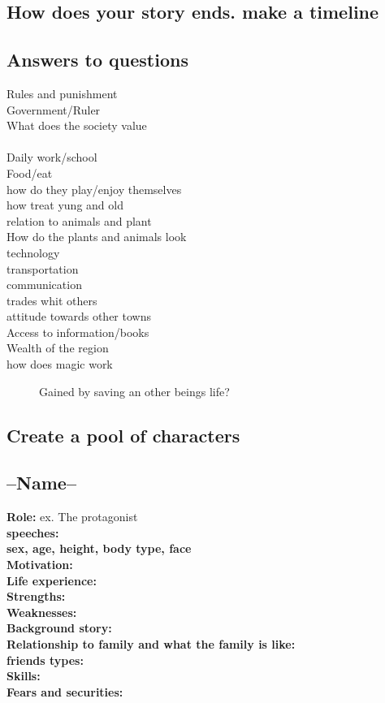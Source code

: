 \documentclass{article}
\begin{document}
\subsection{How does your story ends. make a timeline}


\subsection{Answers to questions}
\label{question}
\begin{description}
\item[Rules and punishment]
\item[Government/Ruler]
\item[What does the society value]
\item[\ ]
\item[Daily work/school]
\item[Food/eat]
\item[how do they play/enjoy themselves]
\item[how treat yung and old]
\item[relation to animals and plant]
\item[How do the plants and animals look]
\item[technology]
\item[transportation]
\item[communication]
\item[trades whit others]
\item[attitude towards other towns]
\item[Access to information/books]
\item[Wealth of the region]
\item[how does magic work] Gained by saving an other beings life?
\end{description}

\subsection{Create a pool of characters}

\subsection{--Name--} 
\textbf{Role:} ex. The protagonist
\\\textbf{speeches:} 
\\\textbf{sex, age, height, body type, face}
\\\textbf{Motivation:}
\\\textbf{Life experience:} 
\\\textbf{Strengths:}  
\\\textbf{Weaknesses:} 
\\\textbf{Background story:}
\\\textbf{Relationship to family and what the family is like:}
\\\textbf{friends types:}
\\\textbf{Skills:}
\\\textbf{Fears and securities:} 
\end{document}
